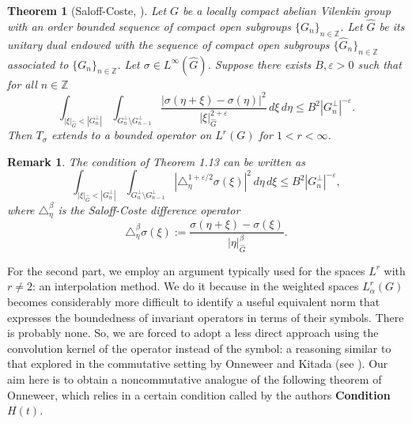 \documentclass[12pt, reqno]{amsart}
\newtheorem{teo}[defi]{Theorem}
\newtheorem{rem}[defi]{Remark}
\newcommand{\1}{\mathds{1}}
\begin{document}
\begin{teo}[Saloff-Coste, \cite{SaloffCoste1986}]\label{teosaloff}Let $G$ be a locally compact abelian Vilenkin group with an
order bounded sequence of compact open subgroups $\{G_n\}_{n \in \mathbb{Z}}$. Let $\widehat{G}$ be its unitary dual endowed
with the sequence of compact open subgroups $\{\widehat{G}_n\}_{n \in \mathbb{Z}}$ associated to $\{G_n\}_{n \in \mathbb{Z}}$. Let $\sigma \in L^\infty(\widehat{G})$.
Suppose there exists $B, \varepsilon > 0$ such that for all $n \in \mathbb{Z}$
\[
\int_{|\xi|_{\widehat{G}} < |G_n^\bot|} \int_{G_n^\bot \setminus G_{n-1}^\bot}
\frac{|\sigma(\eta + \xi) - \sigma(\eta)|^2}{|\xi|^{2+\varepsilon}_{\widehat{G}}} \, d\xi \, d\eta \leq B^2 |G_n^\bot|^{-\varepsilon}.
\]
Then $T_\sigma$ extends to a bounded operator on $L^r(G)$ for $1 < r < \infty$.
\end{teo}

\begin{rem}
The condition of Theorem 1.13 can be written as
\[
\int_{|\xi|_{\widehat{G}} < |G_n^\bot|} \int_{G_n^\bot \setminus G_{n-1}^\bot}
|\triangle^{1+\varepsilon/2}_\eta \sigma(\xi)|^2 \, d\eta \, d\xi \leq B^2 |G_n^\bot|^{-\varepsilon},
\]
where $\triangle^\beta_\eta$ is the Saloff-Coste difference operator
\[
\triangle^\beta_\eta \sigma(\xi) := \frac{\sigma(\eta + \xi) - \sigma(\xi)}{|\eta|^\beta_{\widehat{G}}}.
\]
\end{rem}



For the second part, we employ an argument typically used for the spaces \(L^{r}\) with \(r \neq 2\): an interpolation method. We do it because in the weighted spaces \(L^{r}_{\alpha}(G)\) becomes considerably more difficult to identify a useful equivalent norm that expresses the boundedness of invariant operators in terms of their symbols. There is probably none. So, we are forced to adopt a less direct approach using the convolution kernel of the operator instead of the symbol: a reasoning  similar to that explored in the commutative setting by Onneweer and Kitada (see \cite{Kitada1987, Onneweer1985, Onneweer1989}). Our aim here is to obtain a noncommutative analogue of the following theorem of Onneweer, which relies in a certain condition called by the authors \textbf{Condition $H(t)$}.
\end{document}
